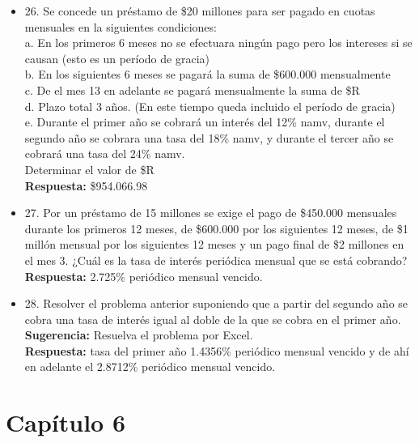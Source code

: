 \begin{itemize}
	\item 26. Se concede un préstamo de \$20 millones para ser pagado en cuotas mensuales en la siguientes condiciones:\\
	
	a. En los primeros 6 meses no se efectuara ningún pago pero los intereses si se causan (esto es un período de gracia)\\
	b. En los siguientes 6 meses se pagará la suma de \$600.000 mensualmente\\
	c. De el mes 13 en adelante se pagará mensualmente la suma de \$R\\
	d. Plazo total 3 años. (En este tiempo queda incluido el período de gracia)\\
	e. Durante el primer año se cobrará un interés del 12\% namv, durante el segundo año se cobrara una tasa del 18\%  namv, y durante el tercer año se cobrará una tasa del 24\%  namv.\\
	Determinar el valor de \$R\\
	\textbf{Respuesta:} \$954.066.98\\
	\medskip
	
	\item 27. Por un préstamo de 15 millones se exige el pago de \$450.000 mensuales durante los primeros 12 meses, de \$600.000 por los siguientes 12 meses, de \$1 millón mensual por los siguientes 12 meses y un pago final de \$2 millones en el mes 3. ¿Cuál es la tasa de interés periódica mensual que se está cobrando?\\
	\textbf{Respuesta:} 2.725\% periódico mensual vencido.\\
	
	\item 28. Resolver el problema anterior suponiendo que a partir del segundo año se cobra una tasa de interés igual al doble de la que se cobra en el primer año.\\ 
	\textbf{Sugerencia:} Resuelva el problema por Excel.\\
	\textbf{Respuesta:} tasa del primer año 1.4356\% periódico mensual vencido y de ahí en adelante el 2.8712\% periódico mensual vencido.\\
	
\end{itemize}
\newpage

\chapter*{Capítulo 6}



